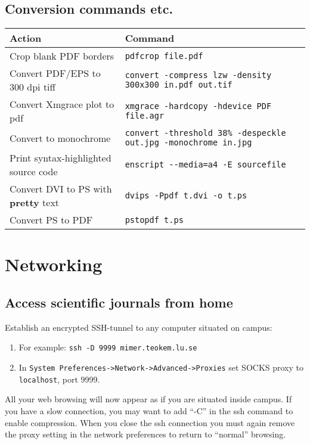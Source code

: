 \documentclass[a4paper,10pt]{article}
\begin{document}
\subsection{Conversion commands etc.}
\begin{table}[h!]
\center
\begin{tabular}{ll}\hline\hline
Action              & Command \\\hline
Crop blank PDF borders & \verb"pdfcrop file.pdf" \\
Convert PDF/EPS to 300 dpi tiff & \verb"convert -compress lzw -density 300x300 in.pdf out.tif" \\
Convert Xmgrace plot to pdf     & \verb"xmgrace -hardcopy -hdevice PDF file.agr"\\
Convert to monochrome           & \verb"convert -threshold 38% -despeckle out.jpg -monochrome in.jpg"\\
Print syntax-highlighted source code & \verb"enscript --media=a4 -E sourcefile"\\
Convert DVI to PS with \textbf{pretty} text & \verb"dvips -Ppdf t.dvi -o t.ps"\\
Convert PS to PDF                           & \verb"pstopdf t.ps"\\
\hline
\end{tabular}\end{table}



\section{Networking}
\subsection{Access scientific journals from home}
Establish an encrypted SSH-tunnel to any computer situated on campus:
\begin{enumerate}
\item For example: \verb+ssh -D 9999 mimer.teokem.lu.se+
\item In \verb+System Preferences->Network->Advanced->Proxies+ set SOCKS proxy to \verb+localhost+, port 9999.
\end{enumerate}
All your web browsing will now appear as if you are situated inside campus. If you have a slow connection, you may want to add ``-C'' in the ssh command to enable compression.  When you close the ssh connection you must again remove the proxy setting in the network preferences to return to ``normal'' browsing.
\end{document}

